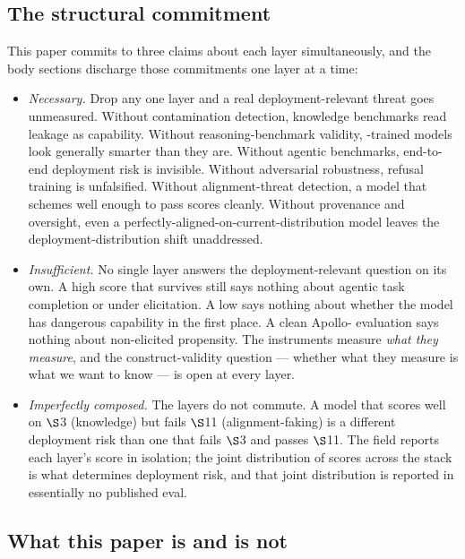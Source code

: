 \subsection*{The structural commitment}

This paper commits to three claims about each layer
simultaneously, and the body sections discharge those commitments
one layer at a time:

\begin{itemize}
  \item \emph{Necessary.} Drop any one layer and a real
    deployment-relevant threat goes unmeasured. Without
    contamination detection, knowledge benchmarks read leakage
    as capability. Without reasoning-benchmark validity, -trained
    models look generally smarter than they are. Without agentic
    benchmarks, end-to-end deployment risk is invisible. Without
    adversarial robustness, refusal training is unfalsified.
    Without alignment-threat detection, a model that schemes well
    enough to pass scores cleanly. Without provenance and
    oversight, even a perfectly-aligned-on-current-distribution
    model leaves the deployment-distribution shift unaddressed.
  \item \emph{Insufficient.} No single layer answers the
    deployment-relevant question on its own. A high  score
    that survives  still says nothing about agentic task
    completion or  under elicitation. A low  
    says nothing about whether the model has dangerous capability
    in the first place. A clean Apollo- evaluation says
    nothing about non-elicited propensity. The instruments measure
    \emph{what they measure}, and the construct-validity question
    --- whether what they measure is what we want to know --- is
    open at every layer.
  \item \emph{Imperfectly composed.} The layers do not commute.
    A model that scores well on $\S$3 (knowledge) but fails $\S$11
    (alignment-faking) is a different deployment risk than one
    that fails $\S$3 and passes $\S$11. The field reports each
    layer's score in isolation; the joint distribution of scores
    across the stack is what determines deployment risk, and that
    joint distribution is reported in essentially no published
    eval.
\end{itemize}

\subsection*{What this paper is and is not}

